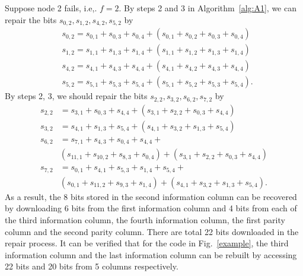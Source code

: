 \documentclass[conference]{IEEEtran}
\begin{document}
Suppose node 2 fails, i.e,. $f=2$. By steps 2 and 3 in Algorithm~\ref{alg:A1}, we can repair the bits $s_{0,2},s_{1,2},s_{4,2},s_{5,2}$ by
\begin{align*}
& s_{0,2}=s_{0,1}+s_{0,3}+s_{0,4}+(s_{0,1}+s_{0,2}+s_{0,3}+s_{0,4}) \\
& s_{1,2}=s_{1,1}+s_{1,3}+s_{1,4}+(s_{1,1}+s_{1,2}+s_{1,3}+s_{1,4}) \\
& s_{4,2}=s_{4,1}+s_{4,3}+s_{4,4}+(s_{4,1}+s_{4,2}+s_{4,3}+s_{4,4}) \\
& s_{5,2}=s_{5,1}+s_{5,3}+s_{5,4}+(s_{5,1}+s_{5,2}+s_{5,3}+s_{5,4}).
\end{align*}
By steps 2, 3, we should repair the bits $s_{2,2},s_{3,2},s_{6,2},s_{7,2}$ by
\begin{align*}
s_{2,2}&=s_{3,1}+s_{0,3}+s_{4,4}+(s_{3,1}+s_{2,2}+s_{0,3}+s_{4,4}) \\
s_{3,2}&=s_{4,1}+s_{1,3}+s_{5,4}+(s_{4,1}+s_{3,2}+s_{1,3}+s_{5,4}) \\
s_{6,2}&=s_{7,1}+s_{4,3}+s_{0,4}+s_{4,4}+\\
&(s_{11,1}+s_{10,2}+s_{8,3}+s_{0,4})+(s_{3,1}+s_{2,2}+s_{0,3}+s_{4,4}) \\
s_{7,2}&=s_{0,1}+s_{4,1}+s_{5,3}+s_{1,4}+s_{5,4}+\\
&(s_{0,1}+s_{11,2}+s_{9,3}+s_{1,4})+(s_{4,1}+s_{3,2}+s_{1,3}+s_{5,4}).
\end{align*}
As a result, the 8 bits stored in the second information column can be recovered by downloading 6 bits from the first information column and 4 bits from each of the third information column, the fourth information column, the first parity column and the second parity column. There are total 22 bits downloaded in the repair process. It can be verified that for the code in Fig.~\ref{example}, the third information column and the last information column can be rebuilt by accessing 22 bits and 20 bits from 5 columns respectively.
\end{document}
